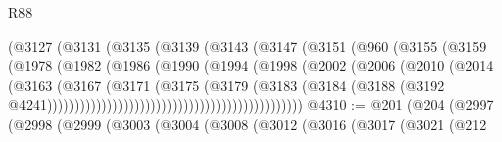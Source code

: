 \begin{lexlean}{R88}
\begin{coremodule}
                                        (@3127
                                          (@3131
                                            (@3135
                                              (@3139
                                                (@3143
                                                  (@3147
                                                    (@3151
                                                      (@960
                                                        (@3155
                                                          (@3159
                                                            (@1978
                                                              (@1982
                                                                (@1986
                                                                  (@1990
                                                                    (@1994
                                                                      (@1998
                                                                        (@2002
                                                                          (@2006
                                                                            (@2010
                                                                              (@2014
                                                                                (@3163
                                                                                  (@3167
                                                                                    (@3171
                                                                                      (@3175
                                                                                        (@3179
                                                                                          (@3183
                                                                                            (@3184
                                                                                              (@3188
                                                                                                (@3192
                                                                                                  @4241)))))))))))))))))))))))))))))))))))))))))))))))
@4310 := @201
    (@204
      (@2997
        (@2998
          (@2999
            (@3003
              (@3004
                (@3008
                  (@3012
                    (@3016
                      (@3017
                        (@3021
                          (@212

\end{coremodule}
\end{lexlean}
